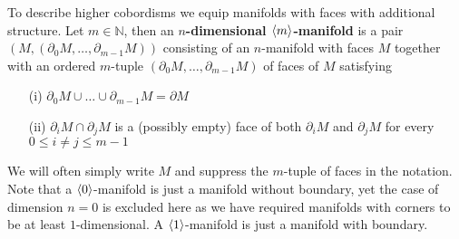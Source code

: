 To describe higher cobordisms we equip manifolds with faces with additional structure. Let $m \in \mathbb{N}$, then an \textbf{$n$-dimensional $\Braket{m}$-manifold} is a pair $(M,(\partial_{0}M,\ldots,\partial_{m-1}M))$ consisting of an $n$-manifold with faces $M$ together with an ordered $m$-tuple $(\partial_{0}M,\ldots,\partial_{m-1}M)$ of faces of $M$ satisfying
\begin{enumerate}
\item[(i)]
$\partial_{0}M \cup \ldots \cup \partial_{m-1}M = \partial M$

\item[(ii)]
$\partial_{i}M \cap \partial_{j}M$ is a (possibly empty) face of both $\partial_{i}M$ and $\partial_{j}M$ for every $0 \leq i \neq j \leq m-1$
\end{enumerate}
We will often simply write $M$ and suppress the $m$-tuple of faces in the notation. Note that a $\Braket{0}$-manifold is just a manifold without boundary, yet the case of dimension $n=0$ is excluded here as we have required manifolds with corners to be at least $1$-dimensional. A $\Braket{1}$-manifold is just a manifold with boundary. 
\\
